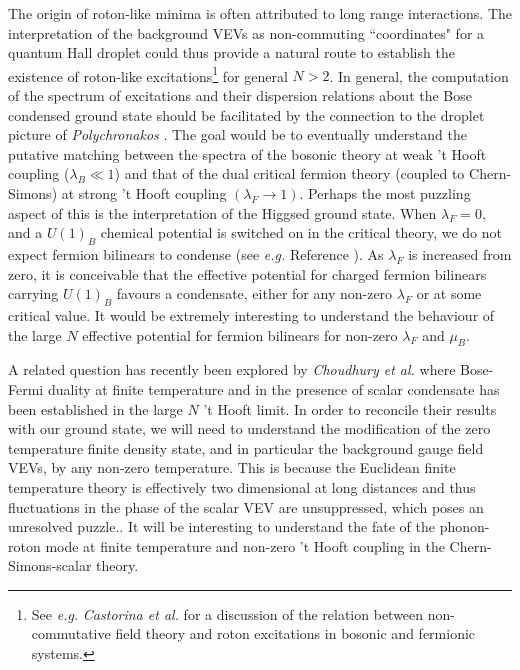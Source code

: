 The  origin of roton-like minima is often attributed to long range interactions. The interpretation of the background VEVs as non-commuting ``coordinates" for a quantum Hall droplet could thus provide a natural route to establish the existence of roton-like excitations\footnote{See \textit{e.g.} \textit{Castorina et al.} \cite{Castorina:2004yd} for a discussion of the relation between non-commutative field theory and roton excitations in bosonic and fermionic systems.} for general $N>2$.  In general, the computation of the spectrum of excitations and their dispersion relations about the Bose condensed ground state should be facilitated by the connection to the droplet picture of \textit{Polychronakos} \cite{Polychronakos:2001mi}. The goal would be to eventually understand the putative matching between the  spectra of the bosonic theory at weak 't Hooft coupling ($\lambda_B\ll 1$) and that of the dual critical fermion theory (coupled to Chern-Simons) at strong 't Hooft coupling $(\lambda_F\to 1)$. Perhaps the most puzzling aspect of this is the interpretation of the Higgsed ground state. When $\lambda_F=0$, and a $U(1)_B$ chemical potential is switched on in the critical theory, we do not  expect fermion bilinears to condense (see \textit{e.g.} Reference \cite{Hands:1998he}). As $\lambda_F$ is increased from zero, it is conceivable that the effective potential for charged fermion bilinears carrying $U(1)_B$ favours a condensate, either for any non-zero $\lambda_F$ or at some critical value. It would be extremely interesting to understand the behaviour of the large $N$ effective potential for fermion bilinears for non-zero $\lambda_F$ and $\mu_B$.



 A related question has recently been explored by \textit{Choudhury et al.} \cite{Choudhury:2018iwf} where Bose-Fermi duality at finite temperature and in the presence of scalar condensate has been established in the large $N$ 't Hooft limit. In order to reconcile their results with our ground state, we will need to understand  the modification of the zero temperature finite density state, and in particular the background gauge field VEVs, by any non-zero temperature. This is because the  Euclidean finite temperature theory is effectively two dimensional at long distances and thus fluctuations in the phase of the scalar VEV are unsuppressed, which poses an unresolved puzzle..  It will be interesting to understand the fate of the phonon-roton mode at finite temperature and non-zero 't Hooft coupling in the Chern-Simons-scalar theory.


